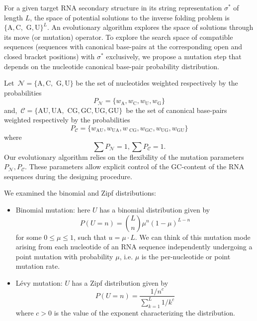 For a given target \ac{RNA} secondary structure in its string representation $\sigma^*$ of length $L$, the space of potential solutions to the inverse folding problem is $\{\text{A},\text{C},\text{ G}, \text{U}\}^L$.
An evolutionary algorithm explores the space of solutions through its move (or mutation) operator. To explore the search space of compatible sequences (sequences with canonical base-pairs at the corresponding open and closed bracket positions) with $\sigma^*$ exclusively, we propose a mutation step that depends on the nucleotide canonical base-pair probability distribution.

Let~\(\mathcal{N}= \big \{ \text{A},\text{C},\text{ G}, \text{U} \big \}\) be the set of nucleotides weighted respectively by the probabilities
\begin{equation*}
P_{\mathcal{N}} = \big \{ w_{\text{A}}, w_{\text{C}}, w_{\text{U}}, w_{\text{G}} \big\}
\end{equation*}
and,~\(\mathcal{C} = \big \{ \text{AU}, \text{UA}, \text{ CG}, \text{GC}, \text{UG}, \text{GU}\big \}\)~be the set of canonical base-pairs weighted respectively by the probabilities
\begin{equation*}
P_{\mathcal{C}} = \big \{w_\text{AU}, w_\text{UA}, w_\text{ CG}, w_\text{GC}, w_\text{UG}, w_\text{GU} \big \} 
\end{equation*}
where
\begin{equation*}
\sum P_{\mathcal{N}} = 1, \sum P_{\mathcal{C}}  = 1.
\end{equation*}
Our evolutionary algorithm relies on the flexibility of the mutation parameters $P_{\mathcal{N}}, P_{\mathcal{C}}$. These parameters allow explicit control of the GC-content of the \ac{RNA} sequences during the designing procedure.

We examined the binomial and Zipf distributions:

\begin{itemize}
	\item Binomial mutation: here $U$ has a binomial distribution given by 
	$$
	P(U=n)= \binom{L}{n} \mu^n (1-\mu)^{L-n}
	$$
	for some $0 \leq \mu \leq 1$, such that $u=\mu \cdot L$. We can think of this mutation mode arising from each nucleotide of an \ac{RNA} sequence independently undergoing a point mutation with probability $\mu$, i.e. $\mu$ is the per-nucleotide or point mutation rate. 
	
	\item Lévy mutation: $U$ has a Zipf distribution given by
	$$
	P(U=n)= \frac{1/n^c}{ \sum_{k=1}^{L}{1/k^c}}
	$$
	where $c>0$ is the value of the exponent characterizing the distribution.
\end{itemize}

